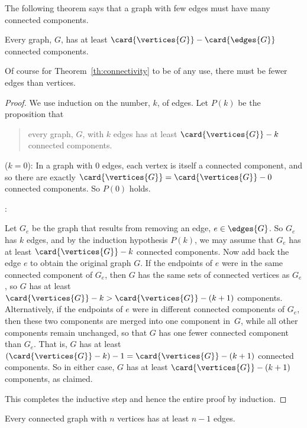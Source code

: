 The following theorem says that a graph with few edges must have many
connected components.
\begin{theorem}\label{th:connectivity}
Every graph, $G$, has at least $\card{\vertices{G}} - \card{\edges{G}}$
connected components.
\end{theorem}
Of course for Theorem~\ref{th:connectivity} to be of any use, there must
be fewer edges than vertices.

\begin{proof}
We use induction on the number, $k$, of edges.  Let $P(k)$ be the
proposition that
\begin{quote}
every graph, $G$, with $k$ edges has at least $\card{\vertices{G}}-k$
connected components.
\end{quote}

 ($k=0$): In a graph with 0 edges, each
vertex is itself a connected component, and so there are exactly
$\card{\vertices{G}} = \card{\vertices{G}} - 0$ connected components.
So $P(0)$ holds.

:

\iffalse
Now we assume that the induction hypothesis holds for every $k$-edge
graph in order to prove that it holds for every $(k+1)$-edge graph,
where $k \geq 0$.
\fi

Let $G_e$ be the graph that results from removing an edge, $e \in
\edges{G}$.  So $G_e$ has $k$ edges, and by the induction hypothesis
$P(k)$, we may assume that $G_e$ has at least $\card{\vertices{G}} -
k$ connected components.  Now add back the edge $e$ to obtain the
original graph $G$.  If the endpoints of $e$ were in the same
connected component of $G_e$, then $G$ has the same sets of connected
vertices as $G_e$, so $G$ has at least $\card{\vertices{G}} - k >
\card{\vertices{G}} - (k+1)$ components.  Alternatively, if the
endpoints of $e$ were in different connected components of $G_e$, then
these two components are merged into one component in~$G$, while all
other components remain unchanged, so that $G$ has one fewer connected
component than $G_e$.  That is, $G$ has at least $(\card{\vertices{G}}
- k) - 1 = \card{\vertices{G}} - (k+1)$ connected components.  So in
either case, $G$ has at least $\card{\vertices{G}} - (k+1)$
components, as claimed.

This completes the inductive step and hence the entire proof by
induction.
\end{proof}

\begin{corollary}
\label{cor:n-1}
Every connected graph with $n$ vertices has at least $n - 1$ edges.
\end{corollary}

